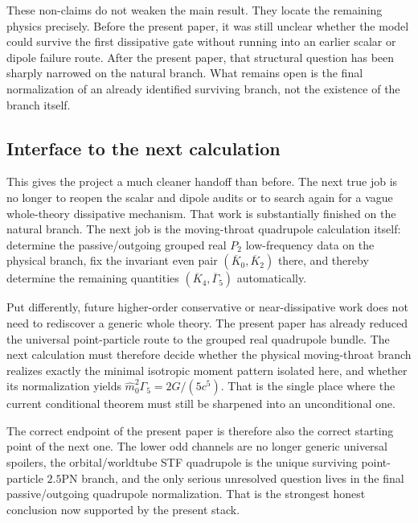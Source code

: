 \documentclass[11pt]{article}
\begin{document}
These non-claims do not weaken the main result.  They locate the remaining
physics precisely.  Before the present paper, it was still unclear whether the
model could survive the first dissipative gate without running into an earlier
scalar or dipole failure route.  After the present paper, that structural
question has been sharply narrowed on the natural branch.  What remains open is the
final normalization of an already identified surviving branch, not the existence
of the branch itself.

\subsection{Interface to the next calculation}
\label{sec:conclusion-next}

This gives the project a much cleaner handoff than before.  The next true job is
no longer to reopen the scalar and dipole audits or to search again for a vague
whole-theory dissipative mechanism.  That work is substantially finished on the
natural branch.  The next job is the moving-throat quadrupole calculation
itself: determine the passive/outgoing grouped real $P_2$ low-frequency data on
the physical branch, fix the invariant even pair
$(\overline K_0,\overline K_2)$ there, and thereby determine the remaining
quantities $(\overline K_4,\overline\Gamma_5)$ automatically.

Put differently, future higher-order conservative or near-dissipative work does
not need to rediscover a generic whole theory.  The present paper has already
reduced the universal point-particle route to the grouped real quadrupole
bundle.  The next calculation must therefore decide whether the physical
moving-throat branch realizes exactly the minimal isotropic moment pattern
isolated here, and whether its normalization yields
\(\hat m_0^2\Gamma_5=2G/(5c^5)\).  That is the single place where the current
conditional theorem must still be sharpened into an unconditional one.

The correct endpoint of the present paper is therefore also the correct starting
point of the next one.  The lower odd channels are no longer generic universal
spoilers, the orbital/worldtube STF quadrupole is the unique surviving
point-particle $2.5$PN branch, and the only serious unresolved question lives in
the final passive/outgoing quadrupole normalization.  That is the strongest
honest conclusion now supported by the present stack.
\end{document}
